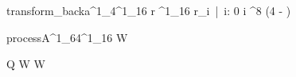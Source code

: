 \documentclass[12pt,a4paper]{book}
\begin{document}
\begin{eqcode}{transform\_back}{a}{^1_4}{^1_{16}}
    r \in {}^1_{16} \lend
    r_i\  |\  i: 0 \leq i  \gets {} ^{8 \cdot (4 - )} \lend
     \lend
\end{eqcode}
%
\begin{eqcode}{process}{A}{^1_{64}}{^1_{16}}
    W \gets \begin{tvector}
         \lend
         \lend
         \lend
         \lend
    \end{tvector} \lend
    Q \gets {} \lend
    W \gets {} \lend \quad W \gets {} \lend


\end{eqcode}
\end{document}
